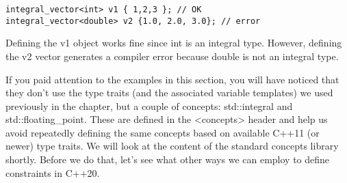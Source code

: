 \begin{lstlisting}[style=styleCXX]
integral_vector<int> v1 { 1,2,3 }; // OK
integral_vector<double> v2 {1.0, 2.0, 3.0}; // error
\end{lstlisting}

Defining the v1 object works fine since int is an integral type. However, defining the v2 vector generates a compiler error because double is not an integral type.

If you paid attention to the examples in this section, you will have noticed that they don’t use the type traits (and the associated variable templates) we used previously in the chapter, but a couple of concepts: std::integral and std::floating\_point. These are defined in the <concepts> header and help us avoid repeatedly defining the same concepts based on available C++11 (or newer) type traits. We will look at the content of the standard concepts library shortly. Before we do that, let’s see what other ways we can employ to define constraints in C++20.































































